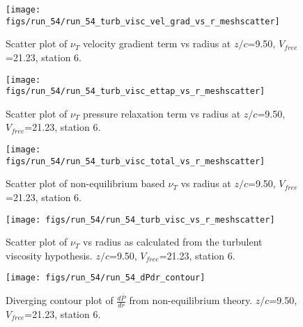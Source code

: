 \begin{figure}[H]
\centering
\texttt{[image: figs/run\_54/run\_54\_turb\_visc\_vel\_grad\_vs\_r\_meshscatter]}
\caption{Scatter plot of $\nu_T$ velocity gradient term vs radius at $z/c$=9.50, $V_{free}$=21.23, station 6.}
\end{figure}


\begin{figure}[H]
\centering
\texttt{[image: figs/run\_54/run\_54\_turb\_visc\_ettap\_vs\_r\_meshscatter]}
\caption{Scatter plot of $\nu_T$ pressure relaxation term vs radius at $z/c$=9.50, $V_{free}$=21.23, station 6.}
\end{figure}


\begin{figure}[H]
\centering
\texttt{[image: figs/run\_54/run\_54\_turb\_visc\_total\_vs\_r\_meshscatter]}
\caption{Scatter plot of non-equilibrium based $\nu_T$ vs radius at $z/c$=9.50, $V_{free}$=21.23, station 6.}
\end{figure}


\begin{figure}[H]
\centering
\texttt{[image: figs/run\_54/run\_54\_turb\_visc\_vs\_r\_meshscatter]}
\caption{Scatter plot of $\nu_T$ vs radius as calculated from the turbulent viscosity hypothesis. $z/c$=9.50, $V_{free}$=21.23, station 6.}
\end{figure}


\begin{figure}[H]
\centering
\texttt{[image: figs/run\_54/run\_54\_dPdr\_contour]}
\caption{Diverging contour plot of $\frac{d\bar{P}}{dr}$ from non-equilibrium theory. $z/c$=9.50, $V_{free}$=21.23, station 6.}
\end{figure}


